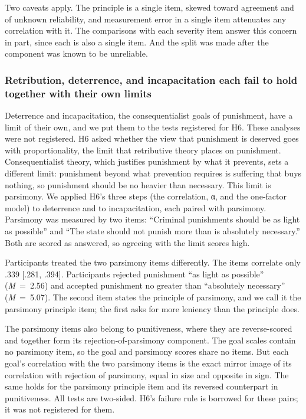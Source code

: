 Two caveats apply. The principle is a single item, skewed toward agreement and of unknown reliability, and measurement error in a single item attenuates any correlation with it. The comparisons with each severity item answer this concern in part, since each is also a single item. And the split was made after the component was known to be unreliable.

\subsubsection{Retribution, deterrence, and incapacitation each fail to hold together with their own limits}\label{retribution-deterrence-and-incapacitation-each-fail-to-hold-together-with-their-own-limits}

Deterrence and incapacitation, the consequentialist goals of punishment, have a limit of their own, and we put them to the tests registered for H6. These analyses were not registered. H6 asked whether the view that punishment is deserved goes with proportionality, the limit that retributive theory places on punishment. Consequentialist theory, which justifies punishment by what it prevents, sets a different limit: punishment beyond what prevention requires is suffering that buys nothing, so punishment should be no heavier than necessary. This limit is parsimony. We applied H6's three steps (the correlation, α, and the one-factor model) to deterrence and to incapacitation, each paired with parsimony. Parsimony was measured by two items: ``Criminal punishments should be as light as possible'' and ``The state should not punish more than is absolutely necessary.'' Both are scored as answered, so agreeing with the limit scores high.

Participants treated the two parsimony items differently. The items correlate only .339 {[}.281, .394{]}. Participants rejected punishment ``as light as possible'' (\emph{M}~=~2.56) and accepted punishment no greater than ``absolutely necessary'' (\emph{M}~=~5.07). The second item states the principle of parsimony, and we call it the parsimony principle item; the first asks for more leniency than the principle does.

The parsimony items also belong to punitiveness, where they are reverse-scored and together form its rejection-of-parsimony component. The goal scales contain no parsimony item, so the goal and parsimony scores share no items. But each goal's correlation with the two parsimony items is the exact mirror image of its correlation with rejection of parsimony, equal in size and opposite in sign. The same holds for the parsimony principle item and its reversed counterpart in punitiveness. All tests are two-sided. H6's failure rule is borrowed for these pairs; it was not registered for them.

